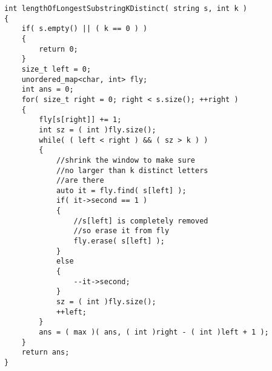 \setcounter{lstlisting}{0}
\begin{lstlisting}[style=customc, caption={Sliding Window With Hash Map}]
int lengthOfLongestSubstringKDistinct( string s, int k )
{
    if( s.empty() || ( k == 0 ) )
    {
        return 0;
    }
    size_t left = 0;
    unordered_map<char, int> fly;
    int ans = 0;
    for( size_t right = 0; right < s.size(); ++right )
    {
        fly[s[right]] += 1;
        int sz = ( int )fly.size();
        while( ( left < right ) && ( sz > k ) )
        {
            //shrink the window to make sure
            //no larger than k distinct letters
            //are there
            auto it = fly.find( s[left] );
            if( it->second == 1 )
            {
                //s[left] is completely removed
                //so erase it from fly
                fly.erase( s[left] );
            }
            else
            {
                --it->second;
            }
            sz = ( int )fly.size();
            ++left;
        }
        ans = ( max )( ans, ( int )right - ( int )left + 1 );
    }
    return ans;
}
\end{lstlisting}

